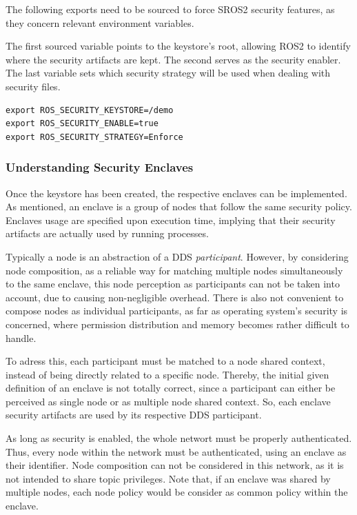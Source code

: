 The following exports need to be sourced to force SROS2 security features, as they concern relevant environment variables.

The first sourced variable points to the keystore's root, allowing ROS2 to identify where the security artifacts are kept. The second serves as the security enabler. The last variable sets which security strategy will be used when dealing with security files.
            
\begin{lstlisting}[title={SROS2 environment variables.}]
export ROS_SECURITY_KEYSTORE=/demo
export ROS_SECURITY_ENABLE=true
export ROS_SECURITY_STRATEGY=Enforce
\end{lstlisting}
            
\subsubsection{Understanding Security Enclaves}

Once the keystore has been created, the respective enclaves can be implemented. As mentioned, an enclave is a group of nodes that follow the same security policy. Enclaves usage are specified upon execution time, implying that their security artifacts are actually used by running processes.

Typically a node is an abstraction of a DDS \textit{participant}. However, by considering node composition, as a reliable way for matching multiple nodes simultaneously to the same enclave, this node perception as participants can not be taken into account, due to causing non-negligible overhead. There is also not convenient to compose nodes as individual participants, as far as operating system's security is concerned, where permission distribution and memory becomes rather difficult to handle.

To adress this, each participant must be matched to a node shared context, instead of being directly related to a specific node. Thereby, the initial given definition of an enclave is not totally correct, since a participant can either be perceived as single node or as multiple node shared context. So, each enclave security artifacts are used by its respective DDS participant. 

As long as security is enabled, the whole networt must be properly authenticated. Thus, every node within the network must be authenticated, using an enclave as their identifier. Node composition can not be considered in this network, as it is not intended to share topic privileges. Note that, if an enclave was shared by multiple nodes, each node policy would be consider as common policy within the enclave.

